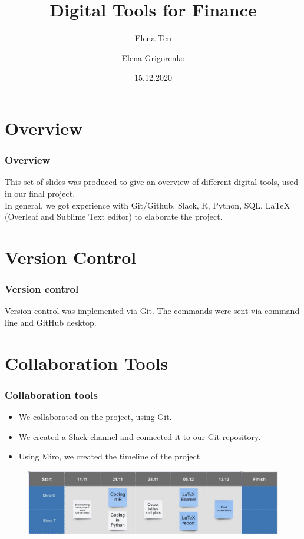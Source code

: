 \documentclass {beamer}
\title{Digital Tools for Finance}
\author [Ten, Grigorenko] {Elena Ten \and Elena Grigorenko}
\institute [UZH] {University of Zurich}
\date {15.12.2020}
\begin{document}
\frame{\titlepage}

\section{Overview}
\begin{frame}
\frametitle{Overview}
This set of slides was produced to give an overview of different digital tools, used in our final project.\\
In general, we got experience with Git/Github, Slack, R, Python, SQL, LaTeX (Overleaf and Sublime Text editor) to elaborate the project. 

\end{frame}



\section{Version Control}
\begin{frame}
\frametitle{Version control}
Version control was implemented via Git. The commands were sent via command line and GitHub desktop.

\end{frame}


\section{Collaboration Tools}
\begin{frame}
\frametitle{Collaboration tools}

\begin{itemize}
\item We collaborated on the project, using Git.
\item We created a Slack channel and connected it to our Git repository.
\item Using Miro, we created the timeline of the project
\end{itemize}

\begin{figure}[!h]
\includegraphics[scale=0.25]{miro}
\label{fig:miro}
\end{figure}


\end{frame}
\end{document}
